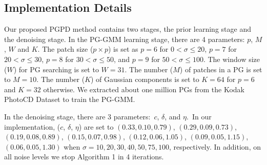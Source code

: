 \subsection{Implementation Details}
Our proposed PGPD method contains two stages, the prior learning stage and the denoising stage. In the PG-GMM learning stage, there are 4 parameters: $p$, $M$, $W$ and $K$. The patch size ($p\times p$) is set as $p = 6$ for $0 < \sigma \le 20$, $p = 7$ for $20 < \sigma \le 30$, $p = 8$ for $30 < \sigma \le 50$, and $p=9$ for $50 < \sigma \le 100$. The window size ($W$) for PG searching is set to $W = 31$. The number ($M$) of patches in a PG is set to $M=10$. The number ($K$) of Gaussian components is set to $K=64$ for $p=6$ and $K=32$ otherwise. We extracted about one million PGs from the Kodak PhotoCD Dataset to train the PG-GMM. 

In the denoising stage, there are 3 parameters:\ $c$, $\delta$, and $\eta$.\ In our implementation, ($c$, $\delta$, $\eta$) are set to $(0.33,0.10,0.79)$, $(0.29,0.09,0.73)$, $(0.19,0.08,0.89)$, $(0.15,0.07,0.98)$, $(0.12,0.06,1.05)$, $(0.09,0.05,1.15)$, $(0.06,0.05,1.30)$ when $\sigma=10,20,30,40,50,75,100$, respectively. In addition, on all noise levels we stop Algorithm 1 in 4 iterations.

